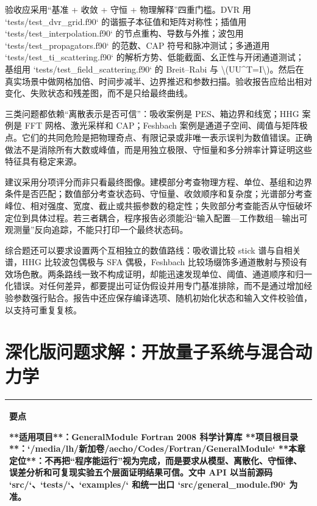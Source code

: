 \documentclass[UTF8,openany,11pt,fontset=fandol]{ctexbook}
\begin{document}
验收应采用``基准 + 收敛 + 守恒 + 物理解释''四重门槛。DVR 用
`tests/test\_dvr\_grid.f90` 的谐振子本征值和矩阵对称性；插值用
`tests/test\_interpolation.f90` 的节点重构、导数与外推；波包用
`tests/test\_propagators.f90` 的范数、CAP 符号和脉冲测试；多通道用
`tests/test\_ti\_scattering.f90`
的解析方势、低能截面、幺正性与开闭通道测试；基组用
`tests/test\_field\_scattering.f90` 的 Breit--Rabi 与
\textbackslash(UU\^{}T=I\textbackslash)。然后在真实场景中做网格加倍、时间步减半、边界推迟和参数扫描。验收报告应给出相对变化、失败状态和残差图，而不是只给最终曲线。

三类问题都依赖``离散表示是否可信''：吸收案例是 PES、箱边界和线宽；HHG
案例是 FFT 网格、激光采样和 CAP；Feshbach
案例是通道子空间、阈值与矩阵极点。它们的共同危险是把物理奇点、有限记录或非唯一表示误判为数值错误。正确做法不是消除所有大数或峰值，而是用独立极限、守恒量和多分辨率计算证明这些特征具有稳定来源。

建议采用分项评分而非只看最终图像。建模部分考查物理方程、单位、基组和边界条件是否匹配；数值部分考查状态码、守恒量、收敛顺序和复杂度；光谱部分考查峰位、相对强度、宽度、截止或共振参数的稳定性；失败部分考查能否从守恒破坏定位到具体过程。若三者耦合，程序报告必须能沿``输入配置---工作数组---输出可观测量''反向追踪，不能只打印一个最终状态码。

综合题还可以要求设置两个互相独立的数值路线：吸收谱比较 stick
谱与自相关谱，HHG 比较波包偶极与 SFA 偶极，Feshbach
比较场缀饰多通道散射与预设有效场色散。两条路线一致不构成证明，却能迅速发现单位、阈值、通道顺序和归一化错误。对任何差异，都要提出可证伪假设并用专门基准排除，而不是通过增加经验参数强行贴合。报告中还应保存编译选项、随机初始化状态和输入文件校验值，以支持可重复复核。

\chapter{深化版问题求解：开放量子系统与混合动力学}\label{ux6df1ux5316ux7248ux95eeux9898ux6c42ux89e3ux5f00ux653eux91cfux5b50ux7cfbux7edfux4e0eux6df7ux5408ux52a8ux529bux5b66}

\begin{longtable}[]{@{}l@{}}
\toprule
\endhead
\begin{minipage}[t]{0.97\columnwidth}\raggedright
\textbf{要点}

**适用项目**：GeneralModule Fortran 2008 科学计算库
**项目根目录**：`/media/lh/新加卷/aecho/Codes/Fortran/GeneralModule`
**本章定位**：不再把``程序能运行''视为完成，而是要求从模型、离散化、守恒律、误差分析和可复现实验五个层面证明结果可信。文中
API 以当前源码 `src/`、`tests/`、`examples/` 和统一出口
`src/general\_module.f90` 为准。\strut
\end{minipage}\tabularnewline
\bottomrule
\end{longtable}
\end{document}
